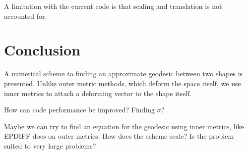 \documentclass[a4paper, 10pt]{article}
\newcommand{\eq}[1]{(\ref{eq:#1})}
\newcommand{\vect}[1]{\ensuremath{\mathbf{#1}}}
\newcommand{\hvect}[1]{\ensuremath{\hat{\vect{#1}}}}
\begin{document}


A limitation with the current code is that scaling and translation is not accounted for.


\section{Conclusion}

A numerical scheme to finding an approximate geodesic between two shapes is presented. Unlike outer metric methods, which deform the space itself, we use inner metrics to attach a deforming vector to the shape itself.

How can code performance be improved? Finding $\sigma$?

Maybe we can try to find an equation for the geodesic using inner metrics, like EPDIFF does on outer metrics. How does the scheme scale? Is the problem suited to very large problems?





\end{document}
